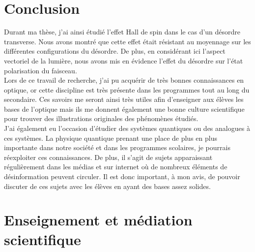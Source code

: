 \documentclass[a4paper,11pt]{article} %
\begin{document}
	
	\section{Conclusion}
	
	Durant ma thèse, j'ai ainsi étudié l'effet Hall de spin dans le cas d'un désordre transverse. Nous avons montré que cette effet était résistant au moyennage sur les différentes configurations du désordre. De plus, en considérant ici l'aspect vectoriel de la lumière, nous avons mis en évidence l'effet du désordre sur l'état polarisation du faisceau.\\
	
	Lors de ce travail de recherche, j'ai pu acquérir de très bonnes connaissances en optique, or cette discipline est très présente dans les programmes tout au long du secondaire. Ces savoirs me seront ainsi très utiles afin d'enseigner aux élèves les bases de l'optique mais ils me donnent également une bonne culture scientifique pour trouver des illustrations originales des phénomènes étudiés.\\
	
	J'ai également eu l'occasion d'étudier des systèmes quantiques ou des analogues à ces systèmes. La physique quantique prenant une place de plus en plus importante dans notre société et dans les programmes scolaires, je pourrais réexploiter ces connaissances. De plus, il s'agit de sujets apparaissant régulièrement dans les médias et sur internet où de nombreux éléments de désinformation peuvent circuler. Il est donc important, à mon avis, de pouvoir discuter de ces sujets avec les élèves en ayant des bases assez solides.
	
	
	\section{Enseignement et médiation scientifique}
\end{document}
